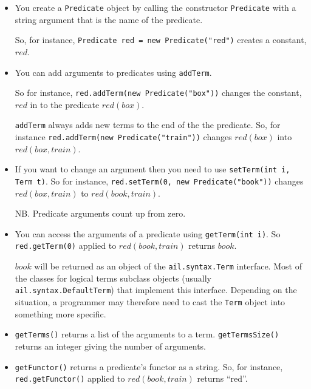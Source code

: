 \begin{itemize}
\item You create a \texttt{Predicate} object by calling the constructor \texttt{Predicate} with a string argument that is the name of the predicate.

So, for instance, \texttt{Predicate red = new Predicate("red")} creates a constant, $red$.  
\item You can add arguments to predicates using \texttt{addTerm}.

So for instance, \texttt{red.addTerm(new Predicate("box"))} changes the constant, $red$ in to the predicate $red(box)$.  

\texttt{addTerm} always adds new terms to the end of the the predicate.  So, for instance \texttt{red.addTerm(new Predicate("train"))} changes $red(box)$ into $red(box, train)$.  

\item If you want to change an argument then you need to use \texttt{setTerm(int i, Term t)}.  So for instance, \texttt{red.setTerm(0, new Predicate("book"))} changes $red(box, train)$ to $red(book, train)$.

NB.  Predicate arguments count up from zero.
\item You can access the arguments of a predicate using \texttt{getTerm(int i)}.  So \texttt{red.getTerm(0)} applied to $red(book, train)$ returns $book$.

\begin{sloppypar}
$book$ will be returned as an object of the \texttt{ail.syntax.Term} interface.  Most of the classes for logical terms subclass objects (usually \texttt{ail.syntax.DefaultTerm}) that implement this interface.  Depending on the situation, a programmer may therefore need to cast the \texttt{Term} object into something more specific.
\end{sloppypar}
\item \texttt{getTerms()} returns a list of the arguments to a term.  \texttt{getTermsSize()} returns an integer giving the number of arguments.
\item \texttt{getFunctor()} returns a predicate's functor as a string.  So, for instance, \texttt{red.getFunctor()} applied to $red(book, train)$ returns ``red''.
\end{itemize}

